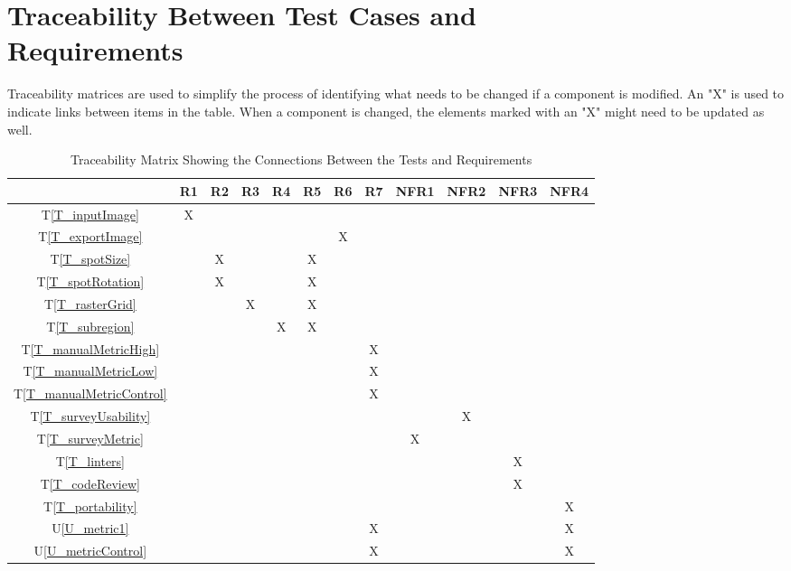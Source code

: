 \documentclass[12pt, titlepage]{article}
\newcommand{\tref}[1]{T\ref{#1}}
\newcommand{\utref}[1]{U\ref{#1}}
\begin{document}
\section{Traceability Between Test Cases and \\ Requirements}
Traceability matrices are used to simplify the process of identifying what needs to be changed 
if a component is modified. An "X" is used to indicate links between items in the table. 
When a component is changed, the elements marked with an "X" might need to be updated as well.

\begin{table}[h!]
  \centering
  \begin{tabular}{|c|c|c|c|c|c|c|c|c|c|c|c|}
  \hline
    & R1
    & R2
    & R3
    & R4
    & R5
    & R6
    & R7
    & NFR1
    & NFR2
    & NFR3
    & NFR4
  \\ \hline
  \tref{T_inputImage}           &X& & & & & & & & & & \\ \hline
  \tref{T_exportImage}          & & & & & &X& & & & & \\ \hline
  \tref{T_spotSize}             & &X& & &X& & & & & & \\ \hline
  \tref{T_spotRotation}         & &X& & &X& & & & & & \\ \hline
  \tref{T_rasterGrid}           & & &X& &X& & & & & & \\ \hline
  \tref{T_subregion}            & & & &X&X& & & & & & \\ \hline
  \tref{T_manualMetricHigh}     & & & & & & &X& & & & \\ \hline
  \tref{T_manualMetricLow}      & & & & & & &X& & & & \\ \hline
  \tref{T_manualMetricControl}  & & & & & & &X& & & & \\ \hline
  \tref{T_surveyUsability}      & & & & & & & & &X& & \\ \hline
  \tref{T_surveyMetric}         & & & & & & & &X& & & \\ \hline
  \tref{T_linters}              & & & & & & & & & &X& \\ \hline
  \tref{T_codeReview}           & & & & & & & & & &X& \\ \hline
  \tref{T_portability}          & & & & & & & & & & &X\\ \hline
  \utref{U_metric1}             & & & & & & &X& & & &X\\ \hline
  \utref{U_metricControl}       & & & & & & &X& & & &X\\ \hline
  \end{tabular}
  \caption{Traceability Matrix Showing the Connections Between the Tests and Requirements}
  \label{Table:A_trace}
\end{table}
\end{document}
